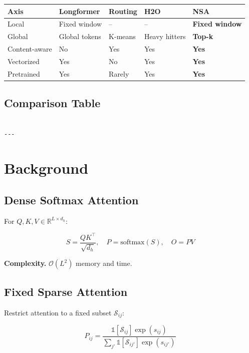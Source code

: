 \begin{table}[H]
\centering
\small
\begin{tabular}{lllll}
\toprule
\textbf{Axis} & \textbf{Longformer} & \textbf{Routing} & \textbf{H2O} & \textbf{NSA} \\
\midrule
Local & Fixed window & -- & -- & \textbf{Fixed window} \\
Global & Global tokens & K-means & Heavy hitters & \textbf{Top-k} \\
Content-aware & No & Yes & Yes & \textbf{Yes} \\
Vectorized & Yes & No & Yes & \textbf{Yes} \\
Pretrained & Yes & Rarely & Yes & \textbf{Yes} \\
\bottomrule
\end{tabular}
\end{table}

\subsection{Comparison Table}

\begin{lstlisting}

---
\end{lstlisting}


\section{Background}

\subsection{Dense Softmax Attention}

For $Q, K, V \in \mathbb{R}^{L \times d_h}$:

\[
S = \frac{QK^\top}{\sqrt{d_h}}, \quad
P = \text{softmax}(S), \quad
O = PV
\tag{3.1}
\]

\textbf{Complexity.} $\mathcal{O}(L^2)$ memory and time.

\subsection{Fixed Sparse Attention}

Restrict attention to a fixed subset $\mathcal{S}_{ij}$:

\[
P_{ij} = \frac{\mathbb{1}[\mathcal{S}_{ij}] \exp(s_{ij})}{\sum_{j'} \mathbb{1}[\mathcal{S}_{ij'}] \exp(s_{ij'})}
\tag{3.2}
\]

